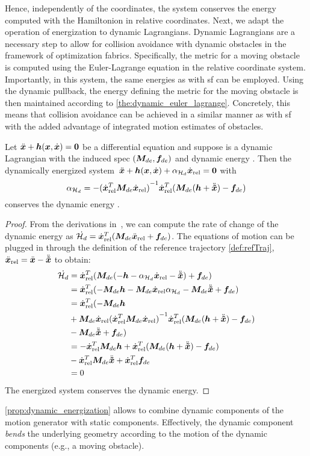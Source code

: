 Hence, independently of the coordinates, the system conserves the energy \hd{} computed with the
Hamiltonion in relative coordinates.
Next, we adapt the operation of energization to dynamic Lagrangians. 
Dynamic Lagrangians are a necessary step to allow
for collision avoidance with dynamic obstacles in the framework of
optimization fabrics.
Specifically, the metric for a moving obstacle is computed
using the Euler-Lagrange equation in the relative coordinate system. Importantly, 
in this system, the same energies as with \ac{sf} can be employed. Using the dynamic
pullback, the energy defining the metric for the moving obstacle is then maintained
according to \cref{the:dynamic_euler_lagrange}. Concretely, this means that
collision avoidance can be achieved in a similar manner as with \ac{sf} with the added
advantage of integrated motion estimates of obstacles.

\begin{proposition}
  Let ${\ddot{\bm{x}} + \bm{h}(\bm{x},\dot{\bm{x}}) = \bm{0}}$ be a differential equation and suppose \ld{} is a
dynamic Lagrangian with the induced spec $(\bm{M}_{de},\bm{f}_{de})$ and dynamic energy \hd{}. Then the
dynamically energized system~{$\ddot{\bm{x}} + \bm{h}(\bm{x},\dot{\bm{x}}) + \alpha_{\mathcal{H}_d}\dot{\bm{x}}_{\textrm{rel}} = \bm{0}$} with 
\[
  \alpha_{\mathcal{H}_d} = -{(\dot{\bm{x}}_{\textrm{rel}}^T\bm{M}_{de}\dot{\bm{x}}_{\textrm{rel}})}^{-1}\dot{\bm{x}}_{\textrm{rel}}^T(\bm{M}_{de}(\bm{h}+\ddot{\bm{\tilde{x}}})-\bm{f}_{de})
\]
conserves the dynamic energy \hd{}.%
\label{prop:dynamic_energization}
\end{proposition}
\begin{proof}
  From the derivations in~\cite{Ratliff2020}, we can compute the rate of change of the
dynamic energy as $\dot{\mathcal{H}_d} = \dot{\bm{x}}_{\textrm{rel}}^T(\bm{M}_{de}\ddot{\bm{x}}_{\textrm{rel}} + \bm{f}_{de})$. The equations of motion can be
plugged in through the definition of the reference trajectory \cref{def:refTraj}, 
$\ddot{\bm{x}}_{\textrm{rel}} = \ddot{\bm{x}} - \ddot{\bm{\tilde{x}}}$ to obtain:
\begin{align*}
  \dot{\mathcal{H}_d} &= \dot{\bm{x}}_{\textrm{rel}}^T(\bm{M}_{de}(-\bm{h}-\alpha_{\mathcal{H}_d}\dot{\bm{x}}_{\textrm{rel}} - \ddot{\bm{\tilde{x}}}) + \bm{f}_{de}) \\
  &= \dot{\bm{x}}_{\textrm{rel}}^T(-\bm{M}_{de}\bm{h}-\bm{M}_{de}\dot{\bm{x}}_{\textrm{rel}}\alpha_{\mathcal{H}_d} - \bm{M}_{de}\ddot{\bm{\tilde{x}}} + \bm{f}_{de}) \\
  &= \dot{\bm{x}}_{\textrm{rel}}^T(-\bm{M}_{de}\bm{h} \\
      & +\bm{M}_{de}\dot{\bm{x}}_{\textrm{rel}}{(\dot{\bm{x}}_{\textrm{rel}}^T\bm{M}_{de}\dot{\bm{x}}_{\textrm{rel}})}^{-1}\dot{\bm{x}}_{\textrm{rel}}^T(\bm{M}_{de}(\bm{h}+\ddot{\bm{\tilde{x}}})-\bm{f}_{de}) \\
      & - \bm{M}_{de}\ddot{\bm{\tilde{x}}} + \bm{f}_{de}) \\
  &= -\dot{\bm{x}}_{\textrm{rel}}^T\bm{M}_{de}\bm{h}
      +\dot{\bm{x}}_{\textrm{rel}}^T(\bm{M}_{de}(\bm{h}+\ddot{\bm{\tilde{x}}})-\bm{f}_{de}) \\
      & - \dot{\bm{x}}_{\textrm{rel}}^T\bm{M}_{de}\ddot{\bm{\tilde{x}}} + \dot{\bm{x}}_{\textrm{rel}}^T\bm{f}_{de} \\
  &= 0
\end{align*}
The energized system conserves the dynamic energy.
\end{proof}
\cref{prop:dynamic_energization} allows to combine dynamic components of the
motion generator
with static components. Effectively, the dynamic component \textit{bends} the
underlying geometry according to the motion of the dynamic components (e.g., a moving
obstacle).

